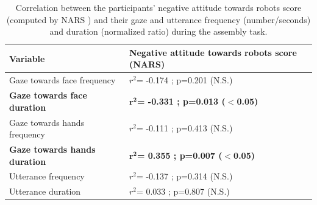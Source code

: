 \begin{table}
\centering
\begin{tabular}{|p{6cm}|p{8cm}|}
\hline
Variable & \textbf{Negative attitude towards robots score (NARS)} \\
\hline
\hline
Gaze towards face frequency  &  $r^2$= -0.174 ; p=0.201 (N.S.) \\
\textbf{Gaze towards face duration}  & \textbf{$\mathbf{r^2}$= -0.331 ; p=0.013 ($\mathbf{<}$0.05)} \\
\hline
Gaze towards hands frequency  &  $r^2$= -0.111 ; p=0.413 (N.S.) \\
\textbf{Gaze towards hands duration}  & \textbf{$\mathbf{r^2}$= 0.355 ; p=0.007 ($\mathbf{<}$0.05)} \\
\hline
Utterance frequency  &	$r^2$= -0.137 ; p=0.314 (N.S.) \\
Utterance duration  &	$r^2$= 0.033 ; p=0.807 (N.S.) \\
\hline
\end{tabular}
\caption{Correlation between the participants' negative attitude towards robots score (computed by NARS \cite{NARS2006}) and their gaze and utterance frequency (number/seconds) and duration (normalized ratio) during the assembly task.}
\label{table:nars}
\end{table}

\begin{table}
\centering
{}
\caption{Correlation between the scores of the NARS sub-scales (computed as in \cite{NARS2006}) of the participants and their gaze and utterance frequency (number/seconds) and duration (normalized ratio) during the assembly task.}
\label{table:narsspecific}
\end{table}


